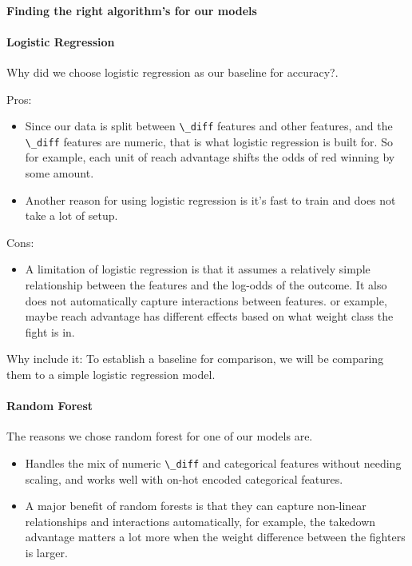 \documentclass[11pt]{article}
\begin{document}
\paragraph*{Finding the right algorithm's for our models}

\paragraph*{Logistic Regression}
Why did we choose logistic regression as our baseline for accuracy?.

Pros:
\begin{itemize}
    \item Since our data is split between \verb|\_diff| features and other features, and the \verb|\_diff| features are numeric, that is what logistic regression is built for. So for example, each unit of reach advantage shifts the odds of red winning by some amount.
    \item Another reason for using logistic regression is it's fast to train and does not take a lot of setup.
\end{itemize}

Cons:
\begin{itemize}
    \item A limitation of logistic regression is that it assumes a relatively simple relationship between the features and the log-odds of the outcome. It also does not automatically capture interactions between features. or example, maybe reach advantage has different effects based on what weight class the fight is in.
\end{itemize}

Why include it: To establish a baseline for comparison, we will be comparing them to a simple logistic regression model.

\paragraph*{Random Forest}
The reasons we chose random forest for one of our models are.

\begin{itemize}
    \item Handles the mix of numeric \verb|\_diff| and categorical features without needing scaling, and works well with on-hot encoded categorical features.
    \item A major benefit of random forests is that they can capture non-linear relationships and interactions automatically, for example, the takedown advantage matters a lot more when the weight difference between the fighters is larger.
\end{itemize}
\end{document}
